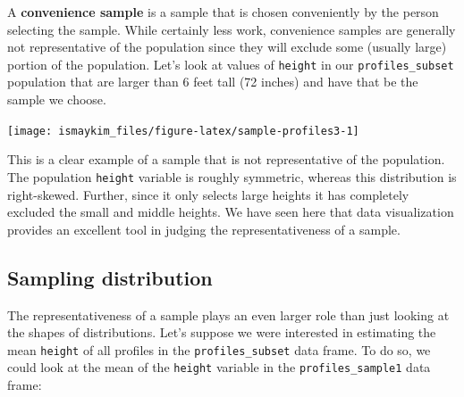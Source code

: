 \documentclass[]{tufte-book}
\newenvironment{Shaded}{\begin{snugshade}}{\end{snugshade}}
\newcommand{\KeywordTok}[1]{\textcolor[rgb]{0.13,0.29,0.53}{\textbf{{#1}}}}
\newcommand{\DataTypeTok}[1]{\textcolor[rgb]{0.13,0.29,0.53}{{#1}}}
\newcommand{\DecValTok}[1]{\textcolor[rgb]{0.00,0.00,0.81}{{#1}}}
\newcommand{\StringTok}[1]{\textcolor[rgb]{0.31,0.60,0.02}{{#1}}}
\newcommand{\NormalTok}[1]{{#1}}
\theoremstyle{definition}
\theoremstyle{definition}
\theoremstyle{remark}
\begin{document}
A \textbf{convenience sample} is a sample that is chosen conveniently by
the person selecting the sample. While certainly less work, convenience
samples are generally not representative of the population since they
will exclude some (usually large) portion of the population. Let's look
at values of \texttt{height} in our \texttt{profiles\_subset} population
that are larger than 6 feet tall (72 inches) and have that be the sample
we choose.

\begin{Shaded}
\end{Shaded}

\begin{center}\texttt{[image: ismaykim\_files/figure-latex/sample-profiles3-1]} \end{center}

This is a clear example of a sample that is not representative of the
population. The population \texttt{height} variable is roughly
symmetric, whereas this distribution is right-skewed. Further, since it
only selects large heights it has completely excluded the small and
middle heights. We have seen here that data visualization provides an
excellent tool in judging the representativeness of a sample.

\subsection{Sampling distribution}\label{sampling-distribution}

The representativeness of a sample plays an even larger role than just
looking at the shapes of distributions. Let's suppose we were interested
in estimating the mean \texttt{height} of all profiles in the
\texttt{profiles\_subset} data frame. To do so, we could look at the
mean of the \texttt{height} variable in the \texttt{profiles\_sample1}
data frame:
\end{document}
